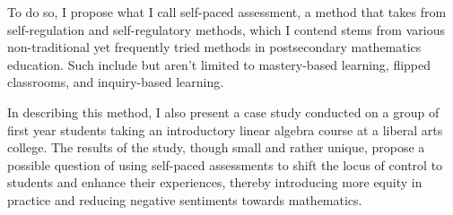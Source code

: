 To do so, I propose what I call self-paced assessment, a method that takes from self-regulation and self-regulatory methods, which I contend stems from various non-traditional yet frequently tried methods in postsecondary mathematics education. Such include but aren't limited to mastery-based learning, flipped classrooms, and inquiry-based learning.

In describing this method, I also present a case study conducted on a group of first year students taking an introductory linear algebra course at a liberal arts college. The results of the study, though small and rather unique, propose a possible question of using self-paced assessments to shift the locus of control to students and enhance their experiences, thereby introducing more equity in practice and reducing negative sentiments towards mathematics.
